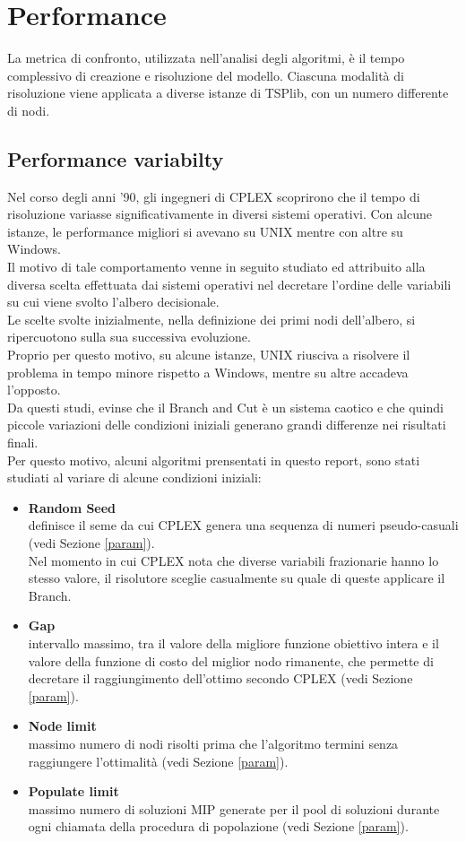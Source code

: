 \chapter{Performance}\label{PERF_PROF}
La metrica di confronto, utilizzata nell'analisi degli algoritmi, è il tempo complessivo di creazione e risoluzione del modello. Ciascuna modalità di risoluzione viene applicata a diverse istanze di TSPlib, con un numero differente di nodi.  
\section{Performance variabilty}
Nel corso degli anni '90, gli ingegneri di CPLEX scoprirono che il tempo di risoluzione variasse significativamente in diversi sistemi operativi. Con alcune istanze, le performance migliori si avevano su UNIX mentre con altre su Windows.\\
Il motivo di tale comportamento venne in seguito studiato ed attribuito alla diversa scelta effettuata dai sistemi operativi nel decretare l'ordine delle variabili su cui viene svolto l'albero decisionale.\\
Le scelte svolte inizialmente, nella definizione dei primi nodi dell'albero, si ripercuotono sulla sua successiva evoluzione.\\
Proprio per questo motivo, su alcune istanze, UNIX riusciva a risolvere il problema in tempo minore rispetto a Windows, mentre su altre accadeva l'opposto.\\
Da questi studi, evinse che il Branch and Cut è un sistema caotico e che quindi piccole variazioni delle condizioni iniziali generano grandi differenze nei risultati finali.\\
Per questo motivo, alcuni algoritmi prensentati in questo report, sono stati studiati al variare di alcune condizioni iniziali:
\begin{itemize}
\item{\textbf{Random Seed}\\
definisce il seme da cui CPLEX genera una sequenza di numeri pseudo-casuali (vedi Sezione \ref{param}).\\
Nel momento in cui CPLEX nota che diverse variabili frazionarie hanno lo stesso valore, il risolutore sceglie casualmente su quale di queste applicare il Branch.}
\item{\textbf{Gap}\\
intervallo massimo, tra il valore della migliore funzione obiettivo intera e il valore della funzione di costo del miglior nodo rimanente, che permette di decretare il raggiungimento dell'ottimo secondo CPLEX (vedi Sezione \ref{param}).}
\item{\textbf{Node limit}\\
massimo numero di nodi risolti prima che l'algoritmo termini senza raggiungere l'ottimalità (vedi Sezione \ref{param}).}
\item{\textbf{Populate limit}\\
massimo numero di soluzioni MIP generate per il pool di soluzioni durante ogni chiamata della procedura di popolazione (vedi Sezione \ref{param}).}
\end{itemize}
